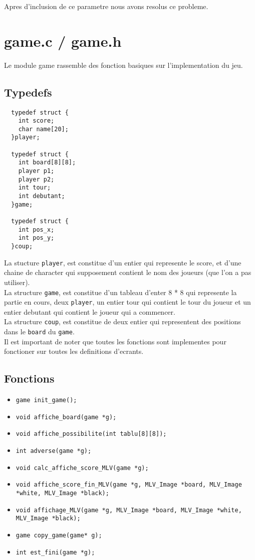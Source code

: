 \documentclass[11pt,a4paper]{article}
\begin{document}
Apres d'inclusion de ce parametre nous avons resolus ce probleme.




\section{game.c / game.h}
Le module game rassemble des fonction basiques sur l'implementation du jeu. 
\subsection{Typedefs}
\begin{lstlisting}
  typedef struct {
    int score;
    char name[20];
  }player;
  
  typedef struct {
    int board[8][8];
    player p1;
    player p2;
    int tour;
    int debutant; 
  }game;
  
  typedef struct {
    int pos_x;
    int pos_y;
  }coup;
\end{lstlisting}



La stucture \texttt{player}, est constitue d'un entier qui represente le score, et d'une chaine de character qui supposement contient le nom des joueurs (que l'on a pas utiliser).
\\
La structure \texttt{game}, est constitue d'un tableau d'enter 8 * 8 qui represente la partie en cours, deux \texttt{player}, un entier tour qui contient le tour du joueur et un entier debutant qui contient le joueur qui a commencer.
\\
La structure \texttt{coup}, est constitue de deux entier qui representent des positions dans le \texttt{board} du \texttt{game}.
\\
Il est important de noter que toutes les fonctions sont implementes pour fonctioner sur toutes les definitions d'ecrants.

\subsection{Fonctions}

\begin{itemize}
  
\item \texttt{game init\_game();}
\item \texttt{void affiche\_board(game *g);}
\item \texttt{void affiche\_possibilite(int tablu[8][8]);}
\item \texttt{int adverse(game *g);}
\item \texttt{void calc\_affiche\_score\_MLV(game *g);}
\item \texttt{void affiche\_score\_fin\_MLV(game *g, MLV\_Image *board, MLV\_Image *white, MLV\_Image *black);}
\item \texttt{void affichage\_MLV(game *g, MLV\_Image *board, MLV\_Image *white, MLV\_Image *black);}
\item \texttt{game copy\_game(game* g);}
\item \texttt{int est\_fini(game *g);}
  
\end{itemize}
\end{document}
